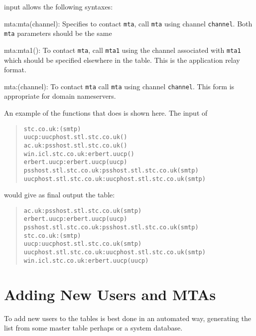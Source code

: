 input allows the following syntaxes:
\begin{describe}
\item[mta:mta(channel):]	Specifies to contact \verb|mta|, call
\verb|mta| using channel \verb|channel|. Both \verb|mta| parameters
should be the same
\item[mta:mta1():]	To contact \verb|mta|, call \verb|mta1| using
the channel associated with \verb|mta1| which should be specified
elsewhere in the  table.
This is the application relay format.
\item[mta:(channel):]	To contact \verb|mta| call \verb|mta| using
channel \verb|channel|. This form is appropriate for domain nameservers.

\end{describe}

An example of the functions that  does is shown here.
The input of
\begin{quote}\small\begin{verbatim}
stc.co.uk:(smtp)
uucp:uucphost.stl.stc.co.uk()
ac.uk:psshost.stl.stc.co.uk()
win.icl.stc.co.uk:erbert.uucp()
erbert.uucp:erbert.uucp(uucp)
psshost.stl.stc.co.uk:psshost.stl.stc.co.uk(smtp)
uucphost.stl.stc.co.uk:uucphost.stl.stc.co.uk(smtp)
\end{verbatim}\end{quote}

would give as final output the table:

\begin{quote}\small\begin{verbatim}
ac.uk:psshost.stl.stc.co.uk(smtp)
erbert.uucp:erbert.uucp(uucp)
psshost.stl.stc.co.uk:psshost.stl.stc.co.uk(smtp)
stc.co.uk:(smtp)
uucp:uucphost.stl.stc.co.uk(smtp)
uucphost.stl.stc.co.uk:uucphost.stl.stc.co.uk(smtp)
win.icl.stc.co.uk:erbert.uucp(uucp)
\end{verbatim}\end{quote}

\section {Adding New Users and MTAs}

To add new users to the tables is best done in an automated way,
generating the list from some master table perhaps or a system
database.


